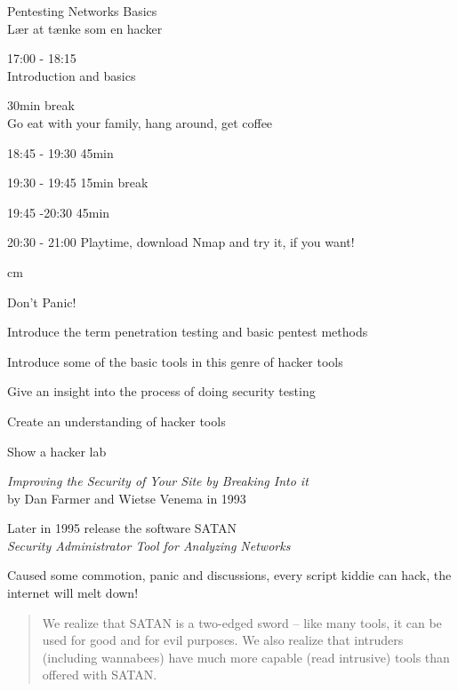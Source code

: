 \documentclass[Screen16to9,17pt]{foils}
\begin{document}

\mytitlepage
{Pentesting Networks Basics\\ Lær at tænke som en hacker}

\LogoOn



\begin{list2}
\item 17:00 - 18:15\\
Introduction and basics
\item 30min break\\
Go eat with your family, hang around, get coffee


\item 18:45 - 19:30 45min\\

\item 19:30 - 19:45 15min break\\

\item 19:45 -20:30 45min\\
\item 20:30 - 21:00 Playtime, download Nmap and try it, if you want!
\end{list2}


 cm

\centerline{\color{titlecolor}\LARGE Don't Panic!}


\begin{list1}
\item Introduce the term penetration testing and basic pentest methods
\item Introduce some of the basic tools in this genre of hacker tools
\item Give an insight into the process of doing security testing
\item Create an understanding of hacker tools
\item Show a hacker lab
\end{list1}



\begin{list1}
\item \emph{Improving the Security of Your Site by Breaking Into it}\\ by
Dan Farmer and Wietse Venema in 1993
\item Later in 1995 release the software SATAN\\
\emph{Security Administrator Tool for Analyzing Networks}
\item Caused some commotion, panic and discussions, every script kiddie can hack, the internet will melt down!
\vskip 5mm
\begin{quote}
We realize that SATAN is a two-edged sword -- like
many tools, it can be used for good and for evil
purposes. We also realize that intruders (including
wannabees) have much more capable (read intrusive)
tools than offered with SATAN.
\end{quote}
\end{list1}
\end{document}
